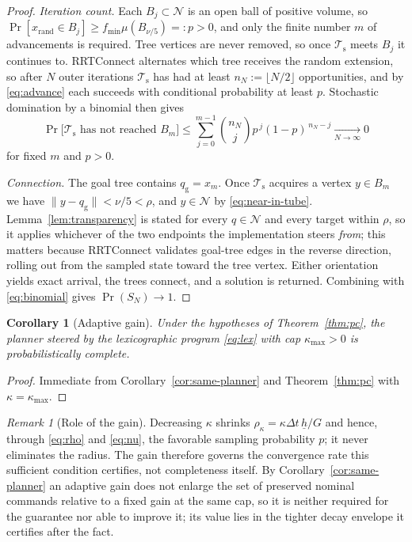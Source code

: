 \documentclass[11pt]{article}
\newtheorem{corollary}{Corollary}
\theoremstyle{remark}
\newtheorem{remark}{Remark}
\newcommand{\Nb}{\mathcal{N}}
\newcommand{\Ts}{\mathcal{T}_{\mathrm{s}}}
\newcommand{\kmax}{\kappa_{\max}}
\begin{document}
\begin{proof}
\emph{Iteration count.} Each $B_j\subset\Nb$ is an open ball of positive volume, so
$\Pr[x_{\mathrm{rand}}\in B_j]\ge f_{\min}\mu(B_{\nu/5})=:p>0$, and only the finite number
$m$ of advancements is required. Tree vertices are never removed, so once $\Ts$ meets $B_j$
it continues to. RRTConnect alternates which tree receives the random extension, so after
$N$ outer iterations $\Ts$ has had at least $n_N:=\lfloor N/2\rfloor$ opportunities, and by
\eqref{eq:advance} each succeeds with conditional probability at least $p$. Stochastic
domination by a binomial then gives
\begin{equation}
\Pr\bigl[\Ts\text{ has not reached }B_m\bigr]
\le\sum_{j=0}^{m-1}\binom{n_N}{j}p^{\,j}(1-p)^{\,n_N-j}\xrightarrow[N\to\infty]{}0
\label{eq:binomial}
\end{equation}
for fixed $m$ and $p>0$.

\emph{Connection.} The goal tree contains $q_{\mathrm g}=x_m$. Once $\Ts$ acquires a vertex
$y\in B_m$ we have $\|y-q_{\mathrm g}\|<\nu/5<\rho$, and $y\in\Nb$ by
\eqref{eq:near-in-tube}. Lemma~\ref{lem:transparency} is stated for every $q\in\Nb$ and
every target within $\rho$, so it applies whichever of the two endpoints the
implementation steers \emph{from}; this matters because RRTConnect validates goal-tree
edges in the reverse direction, rolling out from the sampled state toward the tree vertex.
Either orientation yields exact arrival, the trees connect, and a solution is returned.
Combining with \eqref{eq:binomial} gives $\Pr(S_N)\to1$.
\end{proof}

\begin{corollary}[Adaptive gain]
\label{cor:adaptive}
Under the hypotheses of Theorem~\ref{thm:pc}, the planner steered by the lexicographic
program \eqref{eq:lex} with cap $\kmax>0$ is probabilistically complete.
\end{corollary}

\begin{proof}
Immediate from Corollary~\ref{cor:same-planner} and Theorem~\ref{thm:pc} with
$\kappa=\kmax$.
\end{proof}

\begin{remark}[Role of the gain]
\label{rem:gain-role}
Decreasing $\kappa$ shrinks $\rho_\kappa=\kappa\Delta t\,\underline h/G$ and hence, through
\eqref{eq:rho} and \eqref{eq:nu}, the favorable sampling probability $p$; it never
eliminates the radius. The gain therefore governs the convergence rate this sufficient
condition certifies, not completeness itself. By Corollary~\ref{cor:same-planner} an
adaptive gain does not enlarge the set of preserved nominal commands relative to a fixed
gain at the same cap, so it is neither required for the guarantee nor able to improve it;
its value lies in the tighter decay envelope it certifies after the fact.
\end{remark}
\end{document}
